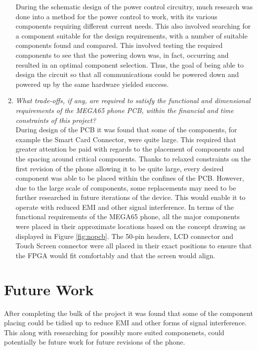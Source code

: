 \begin{enumerate}
	During the schematic design of the power control circuitry, much research was done into a method for the power control to work, with its various components requiring different current needs. 
This also involved searching for a component suitable for the design requirements, with a number of suitable components found and compared. 
This involved testing the required components to see that the powering down was, in fact, occurring and resulted in an optimal component selection. 
Thus, the goal of being able to design the circuit so that all communications could be powered down and powered up by the same hardware yielded success.\\
	
\item \textit{What trade-offs, if any, are required to satisfy the functional and dimensional requirements of the MEGA65 phone PCB, within the financial and time constraints of this project?}\\

	During design of the PCB it was found that some of the components, for example the Smart Card Connector, were quite large. 
This required that greater attention be paid with regards to the placement of components and the spacing around critical components. 
Thanks to relaxed constraints on the first revision of the phone allowing it to be quite large, every desired component was able to be placed within the confines of the PCB. 
However, due to the large scale of components, some replacements may need to be further researched in future iterations of the device. 
This would enable it to operate with reduced EMI and other signal interference.
In terms of the functional requirements of the MEGA65 phone, all the major components were placed in their approximate locations based on the concept drawing as displayed in Figure \ref{fig:nopcb}. 
The 50-pin headers, LCD connector and Touch Screen connector were all placed in their exact positions to ensure that the FPGA would fit comfortably and that the screen would align.\\

\end{enumerate}

\section{Future Work}

	After completing the bulk of the project it was found that some of the component placing could be tidied up to reduce EMI and other forms of signal interference. This along with researching for possibly more suited componenets, could potentially be future work for future revisions of the phone. 




